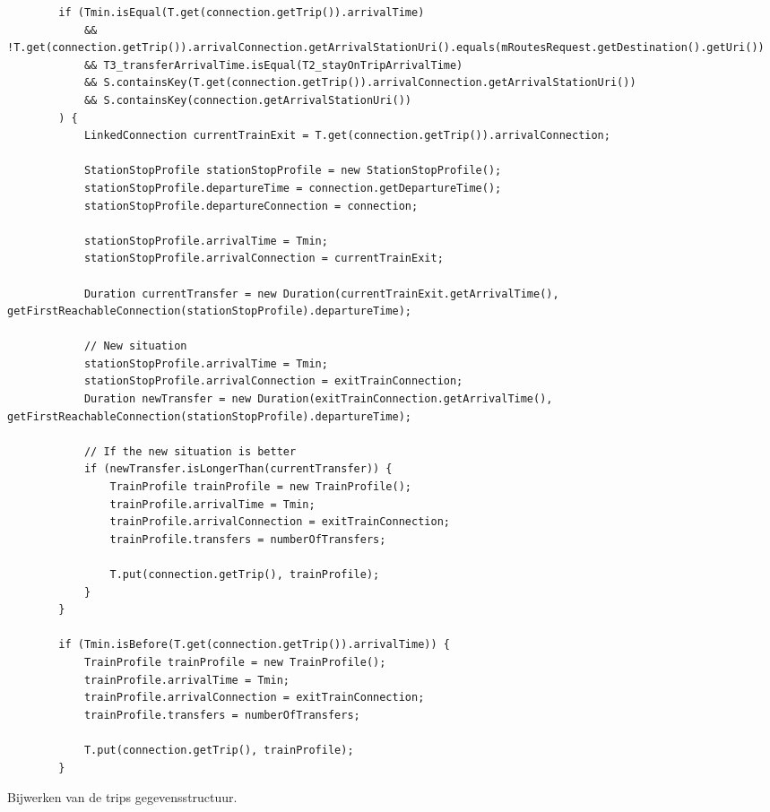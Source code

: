 \begin{listing}[h]
	\begin{verbatim}
        if (Tmin.isEqual(T.get(connection.getTrip()).arrivalTime)
			&& !T.get(connection.getTrip()).arrivalConnection.getArrivalStationUri().equals(mRoutesRequest.getDestination().getUri())
			&& T3_transferArrivalTime.isEqual(T2_stayOnTripArrivalTime)
			&& S.containsKey(T.get(connection.getTrip()).arrivalConnection.getArrivalStationUri())
			&& S.containsKey(connection.getArrivalStationUri())
		) {
			LinkedConnection currentTrainExit = T.get(connection.getTrip()).arrivalConnection;
	
			StationStopProfile stationStopProfile = new StationStopProfile();
			stationStopProfile.departureTime = connection.getDepartureTime();
			stationStopProfile.departureConnection = connection;
		
			stationStopProfile.arrivalTime = Tmin;
			stationStopProfile.arrivalConnection = currentTrainExit;
			
			Duration currentTransfer = new Duration(currentTrainExit.getArrivalTime(), getFirstReachableConnection(stationStopProfile).departureTime);
			
			// New situation
			stationStopProfile.arrivalTime = Tmin;
			stationStopProfile.arrivalConnection = exitTrainConnection;
			Duration newTransfer = new Duration(exitTrainConnection.getArrivalTime(), getFirstReachableConnection(stationStopProfile).departureTime);
			
			// If the new situation is better
			if (newTransfer.isLongerThan(currentTransfer)) {
				TrainProfile trainProfile = new TrainProfile();
				trainProfile.arrivalTime = Tmin;
				trainProfile.arrivalConnection = exitTrainConnection;
				trainProfile.transfers = numberOfTransfers;
				
				T.put(connection.getTrip(), trainProfile);
			}
		}
			
		if (Tmin.isBefore(T.get(connection.getTrip()).arrivalTime)) {
			TrainProfile trainProfile = new TrainProfile();
			trainProfile.arrivalTime = Tmin;
			trainProfile.arrivalConnection = exitTrainConnection;
			trainProfile.transfers = numberOfTransfers;
			
			T.put(connection.getTrip(), trainProfile);
		}
	\end{verbatim}
	\caption[CSA: Bijwerken T]{Bijwerken van de trips gegevensstructuur.}
	\label{code:2:csaT}
\end{listing}

